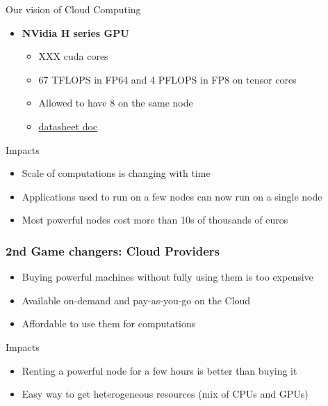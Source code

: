 \documentclass[10pt,aspectratio=1609]{beamer}
\begin{document}
\begin{section}{Our vision of Cloud Computing}
\begin{frame}
\begin{itemize}
    \item \textbf{NVidia H series GPU}
    \begin{itemize}
      \item XXX cuda cores
      \item 67 TFLOPS in FP64 and 4 PFLOPS in FP8 on tensor cores
      \item Allowed to have 8 on the same node
      \item \href{https://nvdam.widen.net/s/nb5zzzsjdf/hpc-datasheet-sc23-h200-datasheet-3002446}{datasheet doc}
    \end{itemize}
  \end{itemize}

  \begin{block}{Impacts}
    \begin{itemize}
      \item Scale of computations is changing with time
      \item Applications used to run on a few nodes can now run on a single node
      \item Most powerful nodes cost more than 10s of thousands of euros
    \end{itemize} 
  \end{block}

\end{frame}


\begin{frame}
  \frametitle{2nd Game changers: Cloud Providers}

    \begin{itemize}
      \item Buying powerful machines without fully using them is too expensive
      \item Available on-demand and pay-as-you-go on the Cloud
      \item Affordable to use them for computations
    \end{itemize}

    \begin{block}{Impacts}
      \begin{itemize}
        \item Renting a powerful node for a few hours is better than buying it
        \item Easy way to get heterogeneous resources (mix of CPUs and GPUs)
      \end{itemize}
    \end{block}
\end{frame}


\end{section}
\end{document}
